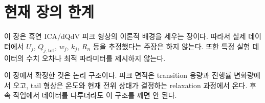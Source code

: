 \documentclass[11pt,a4paper]{article}
\newcommand{\tot}{\mathrm{tot}}
\begin{document}
\section{현재 장의 한계}

이 장은 흑연 ICA/dQdV 피크 형상의 이론적 배경을 세우는 장이다. 따라서 실제 데이터에서 \(U_j\), \(Q_{j,\tot}\), \(w_j\), \(k_j\), \(R_n\) 등을 추정했다는 주장은 하지 않는다. 또한 특정 실험 데이터의 수치 오차나 최적 파라미터를 제시하지 않는다.

이 장에서 확정한 것은 논리 구조이다. 피크 면적은 transition 용량과 진행률 변화량에서 오고, tail 형상은 온도와 현재 전위 상태가 결정하는 relaxation 과정에서 온다. 후속 작업에서 데이터를 다루더라도 이 구조를 깨면 안 된다.
\end{document}
